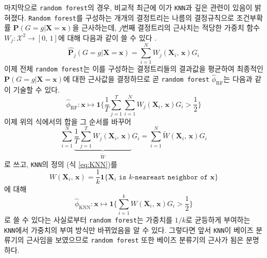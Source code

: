 \documentclass[11pt,onecolumn,twoside,a4size]{gsag3jnl}
\begin{document}
마지막으로 \texttt{random forest}의 경우, 비교적 최근에 이가 \texttt{KNN}과 깊은 관련이 있음이 밝혀졌다. \texttt{Random forest}를 구성하는 개개의 결정트리는 나름의 결정규칙으로 조건부확률 $\mathbf{P}(G=g\vert\mathbf{X}=\mathbf{x})$을 근사하는데, $j$번째 결정트리의 근사치는 적당한 가중치 함수 $W_j:\mathcal{X}^2\to[0,\,1]$에 대해 다음과 같이 쓸 수 있다 \texttt{\citep{lin2006random}}.
\begin{equation}
  \widehat{\mathbf{P}}_j(G=g\vert\mathbf{X}=\mathbf{x})=\sum_{i=1}^NW_j(\mathbf{X}_i,\,\mathbf{x})G_i
\end{equation}
이제 전체 \texttt{random forest}는 이를 구성하는 결정트리들의 결과값을 평균하여 최종적인 $\mathbf{P}(G=g\vert\mathbf{X}=\mathbf{x})$에 대한 근사값을 결정하므로 곧 \texttt{random forest} $\widehat{\phi}_\mathrm{RF}$는 다음과 같이 기술할 수 있다.
\begin{equation}
  \widehat{\phi}_\mathrm{RF}:\mathbf{x}\mapsto\mathbf{1}\bigg\{\frac{1}{T}\sum_{j=1}^T\sum_{i=1}^NW_j(\mathbf{X}_i,\,\mathbf{x})G_i>\frac{1}{2}\bigg\}
\end{equation}
이제 위의 식에서의 합을 그 순서를 바꾸어
\begin{equation}
  \sum_{i=1}^N\underbrace{\frac{1}{T}\sum_{j=1}^TW_j(\mathbf{X}_i,\,\mathbf{x})}_{\widetilde{W}}G_i=\sum_{i=1}^N\widetilde{W}(\mathbf{X}_i,\,\mathbf{x})G_i
\end{equation}
로 쓰고, \texttt{KNN}의 정의 (식 \ref{eq:KNN})를
\begin{equation}
  W(\mathbf{X}_i,\,\mathbf{x})=\frac{1}{k}\mathbf{1}\{\texttt{$\mathbf{X}_i$ is $k$-neareast neighbor of $\mathbf{x}$}\}
\end{equation}
에 대해
\begin{equation}
  \widehat{\phi}_\mathrm{KNN}:\mathbf{x}\mapsto\mathbf{1}\bigg\{\sum_{i=1}^kW(\mathbf{X}_i,\,\mathbf{x})G_i>\frac{1}{2}\bigg\}
\end{equation}
로 쓸 수 있다는 사실로부터 \texttt{random forest}는 가중치를 $1/k$로 균등하게 부여하는 \texttt{KNN}에서 가중치의 부여 방식만 바뀌었음을 알 수 있다. 그렇다면 앞서 \texttt{KNN}이 베이즈 분류기의 근사임을 보였으므로 \texttt{random forest} 또한 베이즈 분류기의 근사가 됨은 분명하다.

\ttfamily

\end{document}
